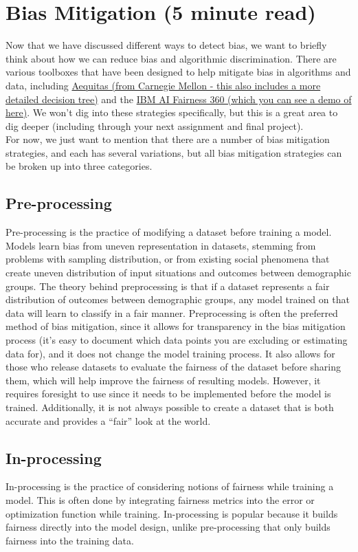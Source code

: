 \documentclass[assignment03_Solutions]{subfiles}
\begin{document}
\section*{Bias Mitigation (5 minute read)}

Now that we have discussed different ways to detect bias, we want to briefly think about how we can reduce bias and algorithmic discrimination. There are various toolboxes that have been designed to help mitigate bias in algorithms and data, including \href{http://www.datasciencepublicpolicy.org/our-work/tools-guides/aequitas/}{Aequitas (from Carnegie Mellon - this also includes a more detailed decision tree)} and the \href{http://aif360.mybluemix.net/data}{IBM AI Fairness 360 (which you can see a demo of here)}. We won't dig into these strategies specifically, but this is a great area to dig deeper (including through your next assignment and final project).\\ 
For now, we just want to mention that there are a number of bias mitigation strategies, and each has several variations, but all bias mitigation strategies can be broken up into three categories.
 \subsection*{Pre-processing}
 Pre-processing is the practice of modifying a dataset before training a model. Models learn bias from uneven representation in datasets, stemming from problems with sampling distribution, or from existing social phenomena that create uneven distribution of input situations and outcomes between demographic groups. The theory behind preprocessing is that if a dataset represents a fair distribution of outcomes between demographic groups, any model trained on that data will learn to classify in a fair manner. Preprocessing is often the preferred method of bias mitigation, since it allows for transparency in the bias mitigation process (it's easy to document which data points you are excluding or estimating data for), and it does not change the model training process. It also allows for those who release datasets to evaluate the fairness of the dataset before sharing them, which will help improve the fairness of resulting models. However, it requires foresight to use since it needs to be implemented before the model is trained. Additionally, it is not always possible to create a dataset that is both accurate and provides a ``fair'' look at the world.
 \subsection*{In-processing}
 In-processing is the practice of considering notions of fairness while training a model. This is often done by integrating fairness metrics into the error or optimization function while training. In-processing is popular because it builds fairness directly into the model design, unlike pre-processing that only builds fairness into the training data.
\end{document}
